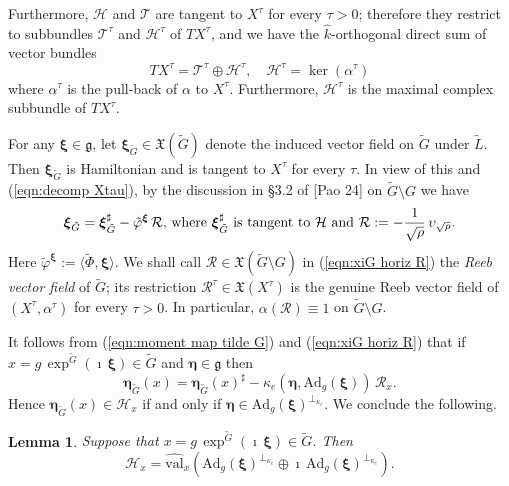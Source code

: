 \documentclass[12pt,a4paper]{article}
\theoremstyle{plain}
\newtheorem{lem}[thm]{Lemma}%
\theoremstyle{definition}
\begin{document}
Furthermore, $\mathcal{H}$ and $\mathcal{T}$ are tangent to $X^\tau$
for every $\tau>0$; therefore they restrict to subbundles $\mathcal{T}^\tau$
and $\mathcal{H}^\tau$ of $TX^\tau$, and we have the $\hat{k}$-orthogonal direct sum of vector bundles
\begin{equation}
\label{eqn:decomp Xtau}
TX^\tau=\mathcal{T}^\tau\oplus \mathcal{H}^\tau,\quad
%
\mathcal{H}^\tau=\ker(\alpha^\tau)
\end{equation}
%
where $\alpha^\tau$ is the pull-back of $\alpha$ to $X^\tau$.
%
Furthermore, $\mathcal{H}^\tau$ is the maximal complex subbundle of
$TX^\tau$.


For any $\boldsymbol{\xi}\in \mathfrak{g}$, let 
$\boldsymbol{\xi}_{\tilde{G}}\in \mathfrak{X}(\tilde{G})$ denote the
induced vector field on $\tilde{G}$ under $\tilde{L}$.
%
%
Then $\boldsymbol{\xi}_{\tilde{G}}$ is Hamiltonian and 
is tangent to $X^\tau$ for every $\tau$.
In view of this and (\ref{eqn:decomp Xtau}), by the discussion in 
\S 3.2 of [Pao 24] on $\tilde{G}\setminus G$ we have
\begin{equation}
\label{eqn:xiG horiz R}
\boldsymbol{\xi}_{\tilde{G}}=\boldsymbol{\xi}_{\tilde{G}}^\sharp
-\tilde{\varphi}^{\boldsymbol{\xi}}\,\mathcal{R},\,
\text{where $\boldsymbol{\xi}_{\tilde{G}}^\sharp$ is tangent to $\mathcal{H}$ and $
\mathcal{R}:=-\frac{1}{\sqrt{\rho}}\,\upsilon_{\sqrt{\rho}}$.}
\end{equation}
%
%
Here $\tilde{\varphi}^{\boldsymbol{\xi}}:=
\langle \tilde{\Phi},\boldsymbol{\xi}\rangle$.
We shall call $\mathcal{R}\in \mathfrak{X}(\tilde{G}\setminus G)$ in (\ref{eqn:xiG horiz R}) the \textit{Reeb vector field} of $\tilde{G}$; its restriction 
$\mathcal{R}^\tau\in \mathfrak{X}(X^\tau)$ is the genuine Reeb vector field
of $(X^\tau,\alpha^\tau)$ for every $\tau>0$.
In particular, $\alpha (\mathcal{R})\equiv 1$ on $\tilde{G}\setminus G$.

It follows from (\ref{eqn:moment map tilde G}) and 
(\ref{eqn:xiG horiz R}) that if 
$x=g\,\exp^{\tilde{G}}(\imath\,\boldsymbol{\xi})\in \tilde{G}$
and $\boldsymbol{\eta}\in \mathfrak{g}$ then
$$
\boldsymbol{\eta}_{\tilde{G}}(x)=
\boldsymbol{\eta}_{\tilde{G}}(x)^\sharp
-\kappa_e\left(\boldsymbol{\eta}, \mathrm{Ad}_g(\boldsymbol{\xi}) \right)\,\mathcal{R}_x.
$$
Hence $\boldsymbol{\eta}_{\tilde{G}}(x)\in \mathcal{H}_x$
if and only if 
$\boldsymbol{\eta}\in \mathrm{Ad}_g(\boldsymbol{\xi})^{\perp_{\kappa_e}}$.
We conclude the following.

\begin{lem}
\label{lem:H_xdirect sum eval}
Suppose that $x=g\,\exp^{\tilde{G}}(\imath\,\boldsymbol{\xi})\in \tilde{G}$.
Then
$$
\mathcal{H}_x=\widehat{\mathrm{val}}_{x}\left(
\mathrm{Ad}_g(\boldsymbol{\xi})^{\perp_{\kappa_e}}\oplus
\imath\,\mathrm{Ad}_g(\boldsymbol{\xi})^{\perp_{\kappa_e}}  
\right)  .
$$
\end{lem}
\end{document}
